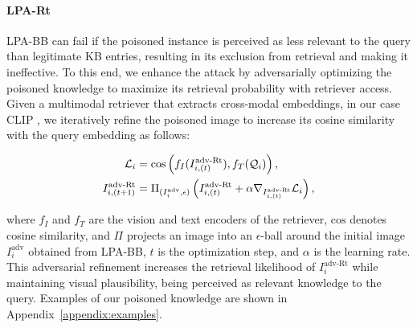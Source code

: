 
\paragraph{LPA-Rt} LPA-BB can fail if the poisoned instance is perceived as less relevant to the query than legitimate KB entries, resulting in its exclusion from retrieval and making it ineffective. To this end, we enhance the attack by adversarially optimizing the poisoned knowledge to maximize its retrieval probability with retriever access. Given a multimodal retriever that extracts cross-modal embeddings, in our case CLIP \citep{radford2021learning}, we iteratively refine the poisoned image to increase its cosine similarity with the query embedding as follows: 
\begin{sizeddisplay}{\normalsize}
\begin{align}
    \label{eq:adv_noise}
    \mathcal{L}_i &= \text{cos} \left(f_I(I_{i, (t)}^{\text{adv-Rt}}), f_T(\mathcal{Q}_i) \right), \notag \\ 
    I_{i, (t+1)}^{\text{adv-Rt}} &= \Pi_{(I_i^{\text{adv}}, \epsilon)}\left( I_{i,(t)}^{\text{adv-Rt}} + \alpha \nabla_{I_{i, (t)}^{\text{adv-Rt}}} \mathcal{L}_{i} \right),
\end{align}
\end{sizeddisplay}
where $f_I$ and $f_T$ are the vision and text encoders of the retriever, $\text{cos}$ denotes cosine similarity, and $\Pi$ projects an image into an 
$\epsilon$-ball around the initial image $I_i^{\text{adv}}$ obtained from LPA-BB, $t$ is the optimization step,  and $\alpha$ is the learning rate. This adversarial refinement increases the retrieval likelihood of $I_{i}^{\text{adv-Rt}}$ while maintaining visual plausibility, being perceived as relevant knowledge to the query. Examples of our poisoned knowledge are shown in Appendix~\ref{appendix:examples}.


